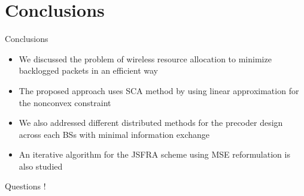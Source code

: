 \documentclass[9pt]{beamer}
\begin{document}
\section{Conclusions}

\begin{frame}{Conclusions}
\begin{itemize}
\item We discussed the problem of wireless resource allocation to minimize backlogged packets in an efficient way
\item The proposed approach uses \ac{SCA} method by using linear approximation for the nonconvex constraint
\item We also addressed different distributed methods for the precoder design across each \acsp{BS} with minimal information exchange
\item An iterative algorithm for the \acs{JSFRA} scheme using \acs{MSE} reformulation is also studied
\end{itemize}
\end{frame}


\begin{frame}
\begin{center}
{\color{blue}\Huge{Questions !}}
\end{center}
\end{frame}
\end{document}
